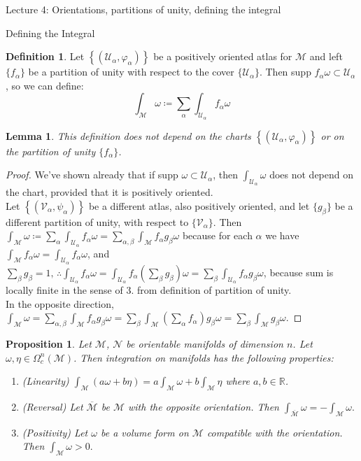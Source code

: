\documentclass[10pt]{article}
\theoremstyle{plain}
\newtheorem{lemma}[thm]{Lemma}
\newtheorem{prop}[thm]{Proposition}
\theoremstyle{definition}
\newtheorem{defn}[thm]{Definition} %
\newcommand{\Real}{\mathbb{R}}
\newcommand{\man}{\mathcal{M}}
\newcommand{\nan}{\mathcal{N}}
\newcommand{\chartU}{\mathcal{U}}
\newcommand{\chartV}{\mathcal{V}}
\newcommand{\chart}{\varphi}
\newcommand{\varchart}{\psi}
\newcommand{\alphaatlas}{\left\{(\chartU_\alpha,\chart_\alpha)\right\}}
\newcommand{\varalphaatlas}{\left\{(\chartV_\alpha,\varchart_\alpha)\right\}}
\newcommand{\compactpformman}[1]{\Omega^{#1}_c(\man)}
\newcommand{\sumfromto}[2]{\sum\limits_{#1}^{#2}}
\begin{document}
\begin{section}{Lecture 4: Orientations, partitions of unity, defining the integral}
\begin{subsection}{Defining the Integral}
\begin{defn}
Let $\alphaatlas$ be a positively oriented atlas for $\man$ and left $\{f_\alpha\}$ be a partition of unity with respect to the cover $\{\chartU_\alpha\}$. Then supp $f_\alpha \omega \subset  \chartU_\alpha$, so we can define:
$$\int_\man \omega \coloneqq \sumfromto{\alpha}{} \int_{\chartU_\alpha} f_\alpha \omega$$
\end{defn}
\begin{lemma}
This definition does not depend on the charts $\alphaatlas$ or on the partition of unity $\{f_\alpha\}$.
\end{lemma}
\begin{proof}
We've shown already that if supp $\omega \subset \chartU_\alpha$, then $\int_{\chartU_\alpha} \omega$ does not depend on the chart, provided that it is positively oriented. \\
Let $\varalphaatlas$ be a different atlas, also positively oriented, and let $\{g_\beta\}$ be a different partition of unity, with respect to $\{\chartV_\alpha\}$. Then $\int_\man \omega \coloneqq \sumfromto{\alpha}{} \int_{\chartU_\alpha} f_\alpha \omega = \sumfromto{\alpha,\beta}{} \int_{\man} f_\alpha g_\beta \omega$ because for each $\alpha$ we have $\int_\man f_\alpha \omega = \int_{\chartU_\alpha}f_\alpha \omega$, and $\sumfromto{\beta}{} g_\beta = 1, \,\therefore  \int_{\chartU_\alpha}f_\alpha \omega =  \int_{\chartU_\alpha}f_\alpha (\sumfromto{\beta}{}g_\beta)\omega = \sumfromto{\beta}{}\int_{\chartU_\alpha}f_\alpha g_\beta \omega$, because sum is locally finite in the sense of 3. from definition of partition of unity.\\
In the opposite direction, $\int_\man \omega = \sumfromto{\alpha,\beta}{~}  \int_\man f_\alpha g_\beta \omega = \sumfromto{\beta}{} \int_\man (\sumfromto{\alpha}{}f_\alpha )g_\beta \omega = \sumfromto{\beta}{}\int_\man g_\beta \omega$.
\end{proof}
\begin{prop}
Let $\man$, $\nan$ be orientable manifolds of dimension $n$. Let $\omega, \eta \in \compactpformman{n}$. Then integration on manifolds has the following properties:
\begin{enumerate}
    \item (Linearity) $\int_\man (a \omega + b\eta) = a \int_\man \omega  + b \int_\man \eta$ where $a,b \in \Real$.
    \item (Reversal) Let $\overline{\man}$ be $\man$ with the opposite orientation. Then $\int_{\overline{\man}}\omega=-\int_{\man}\omega.$
    \item (Positivity) Let $\omega$ be a volume form on $\man$ compatible with the orientation. Then $\int_\man \omega > 0.$

\end{enumerate}
\end{prop}
\end{subsection}
\end{section}
\end{document}
